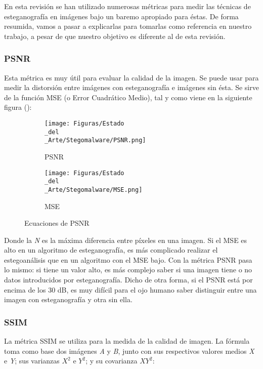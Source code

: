 En esta revisión se han utilizado numerosas métricas para medir las técnicas de esteganografía en imágenes bajo un baremo apropiado para éstas. De forma resumida, vamos a pasar a explicarlas para tomarlas como referencia en nuestro trabajo, a pesar de que nuestro objetivo es diferente al de esta revisión.

\subsubsection{PSNR}

Esta métrica es muy útil para evaluar la calidad de la imagen. Se puede usar para medir la distorsión entre imágenes con esteganografía e imágenes sin ésta. Se sirve de la función \ac{MSE} (o Error Cuadrático Medio), tal y como viene en la siguiente figura (\cite{mse-ssim}): %

\begin{figure}[H]
  \centering
  \begin{subfigure}[H]{0.45\linewidth}
  \centering
  	\texttt{[image: Figuras/Estado\\\_del\\\_Arte/Stegomalware/PSNR.png]}
  	\label{fig:PSNR}
  	\caption{PSNR}
  \end{subfigure}
  \begin{subfigure}[H]{0.45\linewidth}
  \centering
  	\texttt{[image: Figuras/Estado\\\_del\\\_Arte/Stegomalware/MSE.png]}
  	\label{fig:MSE}
  	\caption{MSE}
  \end{subfigure}
  \caption{Ecuaciones de PSNR}
\end{figure}

Donde la \textit{N} es la máxima diferencia entre píxeles en una imagen. Si el \ac{MSE} es alto en un algoritmo de esteganografía, es más complicado realizar el estegoanálisis que en un algoritmo con el \ac{MSE} bajo. Con la métrica \ac{PSNR} pasa lo mismo: si tiene un valor alto, es más complejo saber si una imagen tiene o no datos introducidos por esteganografía. Dicho de otra forma, si el \ac{PSNR} está por encima de los 30 dB, es muy difícil para el ojo humano saber distinguir entre una imagen con esteganografía y otra sin ella.

\subsubsection{SSIM}

La métrica \ac{SSIM} se utiliza para la medida de la calidad de imagen. La fórmula toma como base dos imágenes \textit{A} y \textit{B}, junto con sus respectivos valores medios \textit{X} e \textit{Y}; sus varianzas $X^{2}$ e $Y^{2}$; y su covarianza $XY^{2}$:

